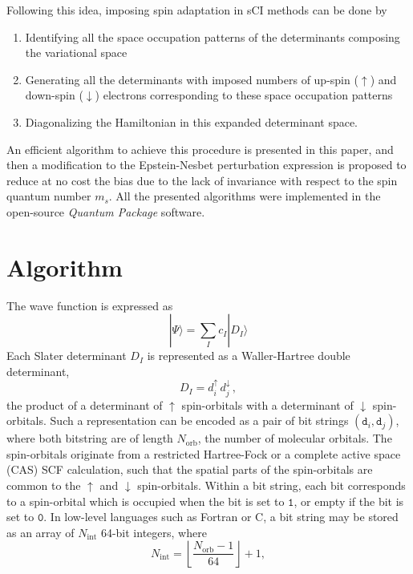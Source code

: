\documentclass[aip,jcp,reprint,showkeys]{revtex4-1}
\newcommand{\ket}[1]{|#1\rangle}
\newcommand{\md}{\mathtt{d}}
\newcommand{\up}{\uparrow}
\newcommand{\dn}{\downarrow}
\newcommand{\Nint}{{N_\text{int}}}
\newcommand{\Norb}{{N_\text{orb}}}
\newcommand{\one}{{\texttt{1}}}
\newcommand{\zero}{{\texttt{0}}}
\newcommand{\sci}{sCI}
\begin{document}
Following this idea, imposing spin adaptation in {\sci} methods can be done by 
\begin{enumerate}
\item Identifying all the space occupation patterns of the determinants composing
      the variational space
\item Generating all the determinants with imposed numbers of up-spin ($\up$) and
      down-spin ($\dn$) electrons corresponding to these space occupation patterns
\item Diagonalizing the Hamiltonian in this expanded determinant space.
\end{enumerate}
An efficient algorithm to achieve this procedure is presented in this paper,
and then a modification to the Epstein-Nesbet perturbation expression is
proposed to reduce at no cost the bias due to the lack of invariance with
respect to the spin quantum number $m_s$.
All the presented algorithms were implemented in the open-source
\emph{Quantum Package} software.\cite{qp}



\section{Algorithm}

The wave function is expressed as
\begin{equation}
\ket{\Psi} = \sum_I c_I \ket{D_I}
\end{equation}
Each Slater determinant $D_I$ is represented as a Waller-Hartree double
determinant,\cite{Pauncz_1989}
\begin{equation}
 \label{eq:di}
 D_I = d_i^\up \, d_j^\dn\, ,
\end{equation}
the product of a determinant of $\up$ spin-orbitals with a determinant of $\dn$
spin-orbitals.
Such a representation can be encoded as a pair of bit strings $(\md_i,\md_j)$,
where both bitstring are of length $\Norb$, the number of molecular orbitals.
The spin-orbitals originate from a restricted Hartree-Fock or a complete
active space (CAS) SCF calculation, such that the spatial parts of the
spin-orbitals are common to the $\up$ and $\dn$ spin-orbitals.
Within a bit string, each bit corresponds to a spin-orbital
which is occupied when the bit is set to $\one$, or empty if the bit is
set to $\zero$.  In low-level languages such as Fortran or C, a bit
string may be stored as an array of $\Nint$ 64-bit integers, where 
\begin{equation}
  \Nint = \left \lfloor \frac{\Norb-1}{64} \right \rfloor + 1,
\end{equation}
\end{document}
